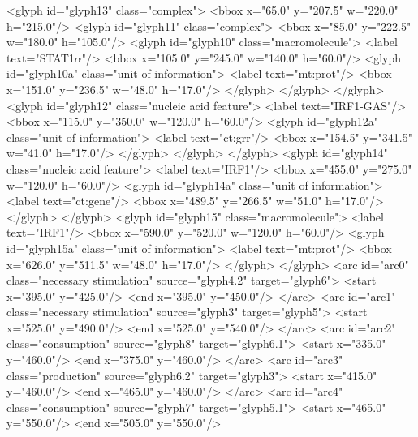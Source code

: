\begin{example}
        <glyph id="glyph13" class="complex">
            <bbox x="65.0" y="207.5" w="220.0" h="215.0"/>
            <glyph id="glyph11" class="complex">
                <bbox x="85.0" y="222.5" w="180.0" h="105.0"/>
                <glyph id="glyph10" class="macromolecule">
                    <label text="STAT1$\alpha$"/>
                    <bbox x="105.0" y="245.0" w="140.0" h="60.0"/>
                    <glyph id="glyph10a" class="unit of information">
                        <label text="mt:prot"/>
                        <bbox x="151.0" y="236.5" w="48.0" h="17.0"/>
                    </glyph>
                </glyph>
            </glyph>
            <glyph id="glyph12" class="nucleic acid feature">
                <label text="IRF1-GAS"/>
                <bbox x="115.0" y="350.0" w="120.0" h="60.0"/>
                <glyph id="glyph12a" class="unit of information">
                    <label text="ct:grr"/>
                    <bbox x="154.5" y="341.5" w="41.0" h="17.0"/>
                </glyph>
            </glyph>
        </glyph>
        <glyph id="glyph14" class="nucleic acid feature">
            <label text="IRF1"/>
            <bbox x="455.0" y="275.0" w="120.0" h="60.0"/>
            <glyph id="glyph14a" class="unit of information">
                <label text="ct:gene"/>
                <bbox x="489.5" y="266.5" w="51.0" h="17.0"/>
            </glyph>
        </glyph>
        <glyph id="glyph15" class="macromolecule">
            <label text="IRF1"/>
            <bbox x="590.0" y="520.0" w="120.0" h="60.0"/>
            <glyph id="glyph15a" class="unit of information">
                <label text="mt:prot"/>
                <bbox x="626.0" y="511.5" w="48.0" h="17.0"/>
            </glyph>
        </glyph>
        <arc id="arc0" class="necessary stimulation" source="glyph4.2" target="glyph6">
            <start x="395.0" y="425.0"/>
            <end x="395.0" y="450.0"/>
        </arc>
        <arc id="arc1" class="necessary stimulation" source="glyph3" target="glyph5">
            <start x="525.0" y="490.0"/>
            <end x="525.0" y="540.0"/>
        </arc>
        <arc id="arc2" class="consumption" source="glyph8" target="glyph6.1">
            <start x="335.0" y="460.0"/>
            <end x="375.0" y="460.0"/>
        </arc>
        <arc id="arc3" class="production" source="glyph6.2" target="glyph3">
            <start x="415.0" y="460.0"/>
            <end x="465.0" y="460.0"/>
        </arc>
        <arc id="arc4" class="consumption" source="glyph7" target="glyph5.1">
            <start x="465.0" y="550.0"/>
            <end x="505.0" y="550.0"/>

\end{example}
